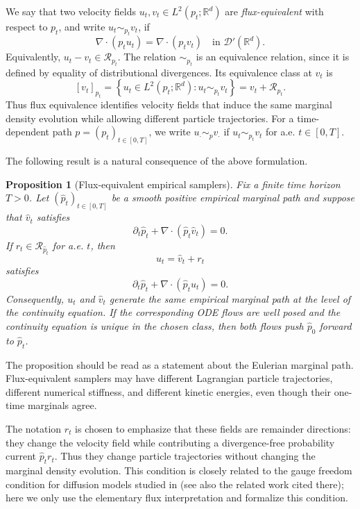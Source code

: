 \documentclass[a4paper,11pt]{article}
\newcommand{\R}{\mathbb{R}}
\theoremstyle{plain}
\newtheorem{propositioninner}[theoreminner]{Proposition}
\theoremstyle{definition}
\newenvironment{proposition}[1][]
  {\begin{mdframed}[style=propositionstyle]\begin{propositioninner}[#1]}
  {\end{propositioninner}\end{mdframed}}
\begin{document}
We say that two velocity fields \(u_t,v_t\in L^2(p_t;\R^d)\) are
\emph{flux-equivalent} with respect to \(p_t\), and write
\(u_t\sim_{p_t}v_t\), if
\[
    \nabla\cdot(p_tu_t)=\nabla\cdot(p_tv_t)
    \quad\text{in }\mathcal D'(\R^d).
\]
Equivalently,
\(
    u_t-v_t\in\mathcal R_{p_t}.
\)
The relation \(\sim_{p_t}\) is an equivalence relation, since it is
defined by equality of distributional divergences. Its equivalence class
at \(v_t\) is
\[
    [v_t]_{p_t}
    =
    \left\{
    u_t\in L^2(p_t;\R^d):
    u_t\sim_{p_t}v_t
    \right\}
    =
    v_t+\mathcal R_{p_t}.
\]
Thus flux equivalence identifies velocity fields that induce the same
marginal density evolution while allowing different particle trajectories. For a time-dependent path \(p=(p_t)_{t\in[0,T]}\), we write
\(u_\cdot\sim_p v_\cdot\) if \(u_t\sim_{p_t}v_t\) for a.e.
\(t\in[0,T]\).

The following result is a natural consequence of the above formulation. 

\begin{proposition}[Flux-equivalent empirical samplers]
\label{prop:flux_equiv}
Fix a finite time horizon \(T>0\). Let \((\hat p_t)_{t\in[0,T]}\) be a smooth positive empirical marginal path and suppose that \(\hat v_t\) satisfies
\[
    \partial_t\hat p_t+\nabla\cdot(\hat p_t\hat v_t)=0.
\]
If \(r_t\in\mathcal R_{\hat p_t}\) for a.e. \(t\), then
\[
    u_t=\hat v_t+r_t
\]
satisfies
\[
    \partial_t\hat p_t+\nabla\cdot(\hat p_tu_t)=0.
\]
Consequently, \(u_t\) and \(\hat v_t\) generate the same empirical marginal path at the level of the continuity equation. If the corresponding ODE flows are well posed and the continuity equation is unique in the chosen class, then both flows push \(\hat p_0\) forward to \(\hat p_t\).
\end{proposition}

The proposition should be read as a statement about the Eulerian marginal path. Flux-equivalent samplers may have different Lagrangian particle trajectories, different numerical stiffness, and different kinetic energies, even though their one-time marginals agree.

The notation \(r_t\) is chosen to emphasize that these fields are remainder directions: they change the velocity field while contributing a divergence-free probability current \(\hat p_t r_t\). Thus they change particle trajectories without changing the marginal density evolution. This condition is closely related to the gauge freedom condition for diffusion models studied in \cite{horvat2024gauge} (see also the related work cited there); here we only use the elementary flux interpretation and formalize this condition.
\end{document}
